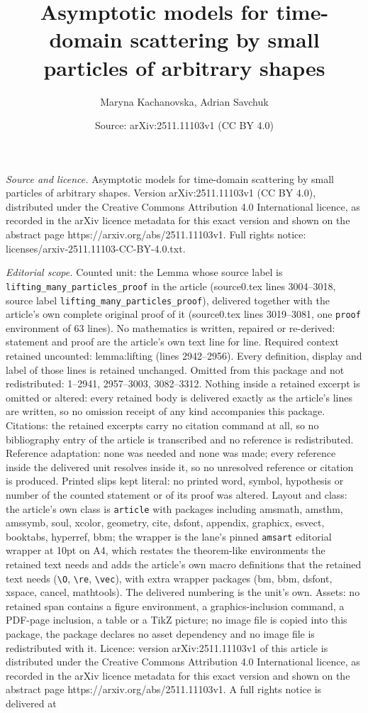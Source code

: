\documentclass[10pt,a4paper]{amsart}
\title[Asymptotic models for time-domain scattering by small partic]{Asymptotic models for time-domain scattering by small particles of arbitrary shapes}
\author{Maryna Kachanovska, Adrian Savchuk}
\date{Source: arXiv:2511.11103v1 (CC BY 4.0)}
\begin{document}
\maketitle

\noindent\emph{Source and licence.} Asymptotic models for time-domain scattering by small particles of arbitrary shapes. Version arXiv:2511.11103v1 (CC BY 4.0), distributed under the Creative Commons Attribution 4.0 International licence, as recorded in the arXiv licence metadata for this exact version and shown on the abstract page https://arxiv.org/abs/2511.11103v1. Full rights notice: licenses/arxiv-2511.11103-CC-BY-4.0.txt.\par\smallskip

\noindent\textit{Editorial scope.} Counted unit: the Lemma whose source label is \texttt{lifting\_many\_particles\_proof} in the article (source0.tex lines 3004--3018, source label \texttt{lifting\_many\_particles\_proof}), delivered together with the article's own complete original proof of it (source0.tex lines 3019--3081, one \texttt{proof} environment of 63 lines). No mathematics is written, repaired or re-derived: statement and proof are the article's own text line for line. Required context retained uncounted: lemma:lifting (lines 2942--2956). Every definition, display and label of those lines is retained unchanged. Omitted from this package and not redistributed: 1--2941, 2957--3003, 3082--3312. Nothing inside a retained excerpt is omitted or altered: every retained body is delivered exactly as the article's lines are written, so no omission receipt of any kind accompanies this package. Citations: the retained excerpts carry no citation command at all, so no bibliography entry of the article is transcribed and no reference is redistributed. Reference adaptation: none was needed and none was made; every reference inside the delivered unit resolves inside it, so no unresolved reference or citation is produced. Printed slips kept literal: no printed word, symbol, hypothesis or number of the counted statement or of its proof was altered. Layout and class: the article's own class is \texttt{article} with packages including amsmath, amsthm, amssymb, soul, xcolor, geometry, cite, dsfont, appendix, graphicx, esvect, booktabs, hyperref, bbm; the wrapper is the lane's pinned \texttt{amsart} editorial wrapper at 10pt on A4, which restates the theorem-like environments the retained text needs and adds the article's own macro definitions that the retained text needs (\texttt{\textbackslash O}, \texttt{\textbackslash re}, \texttt{\textbackslash vec}), with extra wrapper packages (bm, bbm, dsfont, xspace, cancel, mathtools). The delivered numbering is the unit's own. Assets: no retained span contains a figure environment, a graphics-inclusion command, a PDF-page inclusion, a table or a TikZ picture; no image file is copied into this package, the package declares no asset dependency and no image file is redistributed with it. Licence: version arXiv:2511.11103v1 of this article is distributed under the Creative Commons Attribution 4.0 International licence, as recorded in the arXiv licence metadata for this exact version and shown on the abstract page https://arxiv.org/abs/2511.11103v1. A full rights notice is delivered at 
\end{document}
